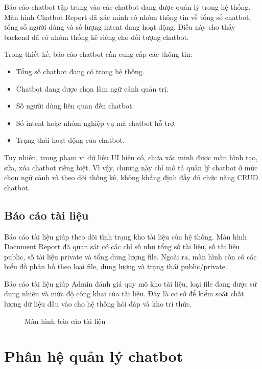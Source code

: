 \documentclass[12pt,a4paper]{report}
\begin{document}
Báo cáo chatbot tập trung vào các chatbot đang được quản lý trong hệ thống. Màn hình Chatbot Report đã xác minh có nhóm thông tin về tổng số chatbot, tổng số người dùng và số lượng intent đang hoạt động. Điều này cho thấy backend đã có nhóm thống kê riêng cho đối tượng chatbot.

Trong thiết kế, báo cáo chatbot cần cung cấp các thông tin:

\begin{itemize}
    \item Tổng số chatbot đang có trong hệ thống.
    \item Chatbot đang được chọn làm ngữ cảnh quản trị.
    \item Số người dùng liên quan đến chatbot.
    \item Số intent hoặc nhóm nghiệp vụ mà chatbot hỗ trợ.
    \item Trạng thái hoạt động của chatbot.
\end{itemize}

Tuy nhiên, trong phạm vi dữ liệu UI hiện có, chưa xác minh được màn hình tạo, sửa, xóa chatbot riêng biệt. Vì vậy, chương này chỉ mô tả quản lý chatbot ở mức chọn ngữ cảnh và theo dõi thống kê, không khẳng định đầy đủ chức năng CRUD chatbot.

\subsection{Báo cáo tài liệu}

Báo cáo tài liệu giúp theo dõi tình trạng kho tài liệu của hệ thống. Màn hình Document Report đã quan sát có các chỉ số như tổng số tài liệu, số tài liệu public, số tài liệu private và tổng dung lượng file. Ngoài ra, màn hình còn có các biểu đồ phân bố theo loại file, dung lượng và trạng thái public/private.

Báo cáo tài liệu giúp Admin đánh giá quy mô kho tài liệu, loại file đang được sử dụng nhiều và mức độ công khai của tài liệu. Đây là cơ sở để kiểm soát chất lượng dữ liệu đầu vào cho hệ thống hỏi đáp và kho tri thức.

\begin{figure}[H]
    \centering
    \caption{Màn hình báo cáo tài liệu}
    \label{fig:statistics-document-report}
\end{figure}

\section{Phân hệ quản lý chatbot}
\end{document}
